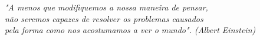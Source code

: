 \begin{epigrafe}
	\vspace*{\fill}
	\begin{flushright}
	\textit{"A menos que modifiquemos a nossa maneira de pensar,\\ não seremos capazes de resolver os problemas causados \\ pela forma como nos acostumamos a ver o mundo". (Albert Einstein)}
	\end{flushright}
\end{epigrafe}